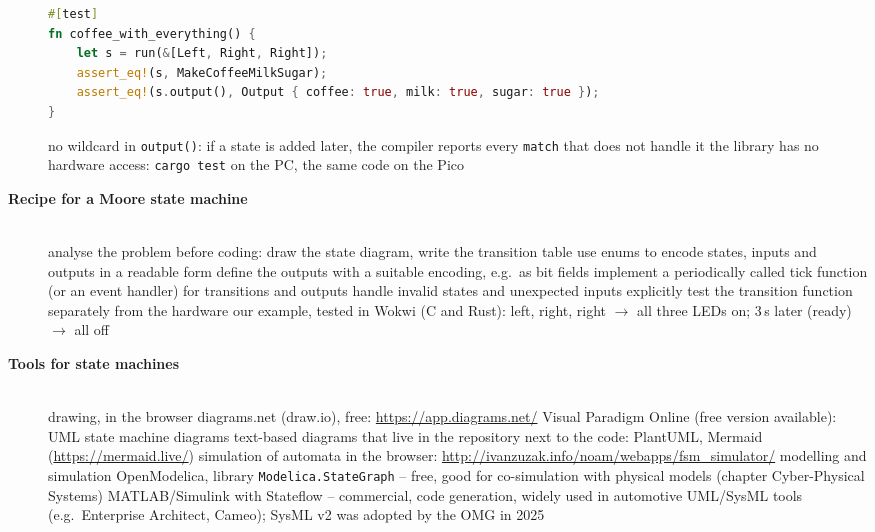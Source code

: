 \begin{description}
\begin{lstlisting}[language=Rust]
#[test]
fn coffee_with_everything() {
    let s = run(&[Left, Right, Right]);
    assert_eq!(s, MakeCoffeeMilkSugar);
    assert_eq!(s.output(), Output { coffee: true, milk: true, sugar: true });
}
\end{lstlisting}
\bi
	\ite no wildcard in \texttt{output()}: if a state is added later, the compiler reports every \texttt{match} that does not handle it
	\ite the library has no hardware access: \texttt{cargo test} on the PC, the same code on the Pico
\ei
\os{\newpage}

\item[{\rot\bf Recipe for a Moore state machine}]~\\[-\lblskip]
\bi
	\ite analyse the problem before coding: draw the state diagram, write the transition table
	\ite use enums to encode states, inputs and outputs in a readable form
	\ite define the outputs with a suitable encoding, e.g.\ as bit fields
	\ite implement a periodically called tick function (or an event handler) for transitions and outputs
	\ite handle invalid states and unexpected inputs explicitly
	\ite test the transition function separately from the hardware
	\ite our example, tested in Wokwi (C and Rust): left, right, right $\rightarrow$ all three LEDs on; 3\,s later (ready) $\rightarrow$ all off
\ei
\os{\newpage}

\item[{\rot\bf Tools for state machines}]~\\[-\lblskip]
\bi
	\ite drawing, in the browser
	\bi
		\ite diagrams.net (draw.io), free: \url{https://app.diagrams.net/}
		\ite Visual Paradigm Online (free version available): UML state machine diagrams
	\ei
	\ite text-based diagrams that live in the repository next to the code: PlantUML, Mermaid (\url{https://mermaid.live/})
	\ite simulation of automata in the browser: \url{http://ivanzuzak.info/noam/webapps/fsm_simulator/}
	\ite modelling and simulation
	\bi
		\ite OpenModelica, library \texttt{Modelica.StateGraph} -- free, good for co-simulation with physical models (chapter Cyber-Physical Systems)
		\ite MATLAB/Simulink with Stateflow -- commercial, code generation, widely used in automotive
		\ite UML/SysML tools (e.g.\ Enterprise Architect, Cameo); SysML v2 was adopted by the OMG in 2025
	\ei
\ei
\os{\newpage}
\end{description}

